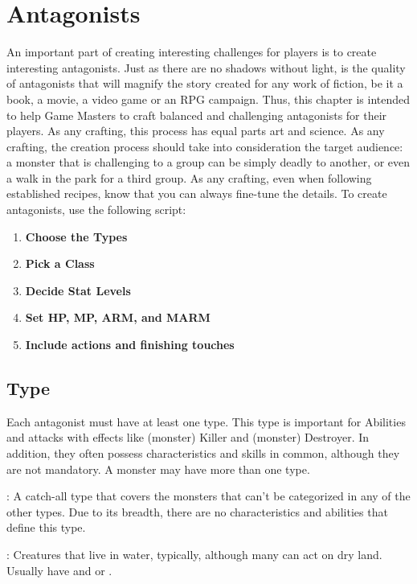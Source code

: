 \section{Antagonists}\label{sec:gm-antagonists}
\begin{multicols}{2}
An important part of creating interesting challenges for players is to create interesting antagonists. Just as there are no shadows without light, is the quality of antagonists that will magnify the story created for any work of fiction, be it a book, a movie, a video game or an RPG campaign. Thus, this chapter is intended to help Game Masters to craft balanced and challenging antagonists for their players. As any crafting, this process has equal parts art and science. As any crafting, the creation process should take into consideration the target audience: a monster that is challenging to a group can be simply deadly to another, or even a walk in the park for a third group. As any crafting, even when following established recipes, know that you can always fine-tune the details. To create antagonists, use the following script:
\begin{enumerate}
    \item \textbf{Choose the Types}
    \item \textbf{Pick a Class}
    \item \textbf{Decide Stat Levels}
    \item \textbf{Set HP, MP, ARM, and MARM}
    \item \textbf{Include actions and finishing touches}
\end{enumerate}

\subsection{Type}\label{subsec:gm-types}
Each antagonist must have at least one type. This type is important for Abilities and attacks with effects like (monster) Killer and (monster) Destroyer. In addition, they often possess characteristics and skills in common, although they are not mandatory. A monster may have more than one type.

\tmtypeaberr{}: A catch-all type that covers the monsters that can’t be categorized in any of the other types. Due to its breadth, there are no characteristics and abilities that define this type.

\tmtypeaqua{}: Creatures that live in water, typically, although many can act on dry land. Usually have  and  or .


\end{multicols}
